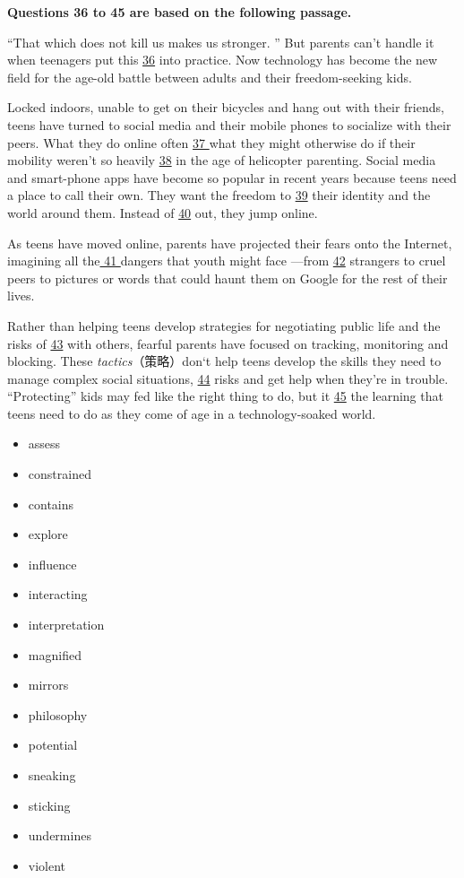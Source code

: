 \documentclass[UTF8,11pt]{ctexart}
\begin{document}
\textbf{Questions 36 to 45 are based on the following passage.}


“That which does not kill us makes us stronger. ” But parents can’t handle it when teenagers put this \uline{36} into practice. Now technology has become the new field for the age-old battle between adults and their freedom-seeking kids.


Locked indoors, unable to get on their bicycles and hang out with their friends, teens have turned to social media and their mobile phones to socialize with their peers. What they do online often \uline{37 }what they might otherwise do if their mobility weren’t so heavily \uline{38} in the age of helicopter parenting. Social media and smart-phone apps have become so popular in recent years because teens need a place to call their own. They want the freedom to \uline{39} their identity and the world around them. Instead of \uline{40} out, they jump online.


As teens have moved online, parents have projected their fears onto the Internet, imagining all the\uline{ 41 }dangers that youth might face —from \uline{42} strangers to cruel peers to pictures or words that could haunt them on Google for the rest of their lives.


Rather than helping teens develop strategies for negotiating public life and the risks of \uline{43} with others, fearful parents have focused on tracking, monitoring and blocking. These\textit{ tactics}（策略）don‘t help teens develop the skills they need to manage complex social situations, \uline{44} risks and get help when they’re in trouble. “Protecting” kids may fed like the right thing to do, but it \uline{45} the learning that teens need to do as they come of age in a technology-soaked world. 


\begin{itemize}[leftmargin=2em,itemsep=.2em,topsep=.4em]\item[A.] assess
\item[B.] constrained
\item[C.] contains
\item[D.] explore
\item[E.] influence
\item[F.] interacting
\item[G.] interpretation
\item[H.] magnified
\item[I.] mirrors
\item[J.] philosophy
\item[K.] potential
\item[L.] sneaking
\item[M.] sticking
\item[N.] undermines
\item[O.] violent
\end{itemize}
\end{document}
